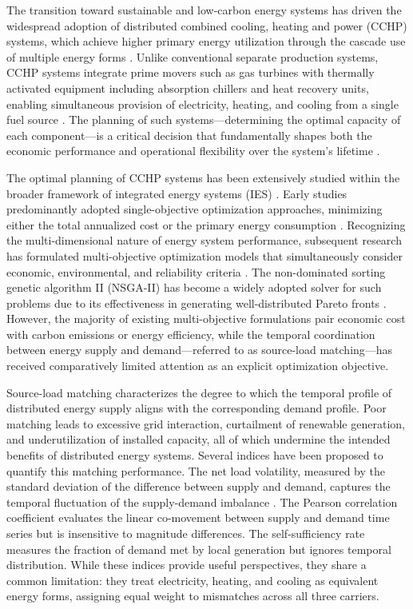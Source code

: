 The transition toward sustainable and low-carbon energy systems has driven the widespread adoption of distributed combined cooling, heating and power (CCHP) systems, which achieve higher primary energy utilization through the cascade use of multiple energy forms \cite{liu2018combined,cho2009combined}. Unlike conventional separate production systems, CCHP systems integrate prime movers such as gas turbines with thermally activated equipment including absorption chillers and heat recovery units, enabling simultaneous provision of electricity, heating, and cooling from a single fuel source \cite{wu2016multiobjective}. The planning of such systems---determining the optimal capacity of each component---is a critical decision that fundamentally shapes both the economic performance and operational flexibility over the system's lifetime \cite{li2016optimal}.

The optimal planning of CCHP systems has been extensively studied within the broader framework of integrated energy systems (IES) \cite{mancarella2014mes,geidl2007energy}. Early studies predominantly adopted single-objective optimization approaches, minimizing either the total annualized cost or the primary energy consumption \cite{ren2010optimal}. Recognizing the multi-dimensional nature of energy system performance, subsequent research has formulated multi-objective optimization models that simultaneously consider economic, environmental, and reliability criteria \cite{wang2019multi,wang2015modelling}. The non-dominated sorting genetic algorithm II (NSGA-II) has become a widely adopted solver for such problems due to its effectiveness in generating well-distributed Pareto fronts \cite{deb2002fast}. However, the majority of existing multi-objective formulations pair economic cost with carbon emissions or energy efficiency, while the temporal coordination between energy supply and demand---referred to as source-load matching---has received comparatively limited attention as an explicit optimization objective.

Source-load matching characterizes the degree to which the temporal profile of distributed energy supply aligns with the corresponding demand profile. Poor matching leads to excessive grid interaction, curtailment of renewable generation, and underutilization of installed capacity, all of which undermine the intended benefits of distributed energy systems. Several indices have been proposed to quantify this matching performance. The net load volatility, measured by the standard deviation of the difference between supply and demand, captures the temporal fluctuation of the supply-demand imbalance \cite{zhang2020comprehensive}. The Pearson correlation coefficient evaluates the linear co-movement between supply and demand time series but is insensitive to magnitude differences. The self-sufficiency rate measures the fraction of demand met by local generation but ignores temporal distribution. While these indices provide useful perspectives, they share a common limitation: they treat electricity, heating, and cooling as equivalent energy forms, assigning equal weight to mismatches across all three carriers.

